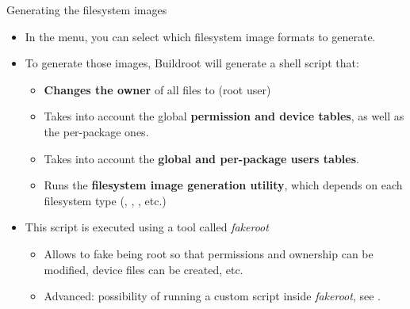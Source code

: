 \begin{frame}{Generating the filesystem images}

  \begin{itemize}
  \item In the  menu, you can select which
    filesystem image formats to generate.
  \item To generate those images, Buildroot will generate a shell
    script that:
    \begin{itemize}
    \item {\bf Changes the owner} of all files to  (root user)
    \item Takes into account the global {\bf permission and device tables},
      as well as the per-package ones.
    \item Takes into account the {\bf global and per-package users
        tables}.
    \item Runs the {\bf filesystem image generation utility}, which
      depends on each filesystem type (,
      , , etc.)
    \end{itemize}
  \item This script is executed using a tool called {\em fakeroot}
    \begin{itemize}
    \item Allows to fake being root so that permissions and ownership
      can be modified, device files can be created, etc.
    \item Advanced: possibility of running a custom script inside {\em
        fakeroot}, see .
    \end{itemize}
  \end{itemize}
\end{frame}

